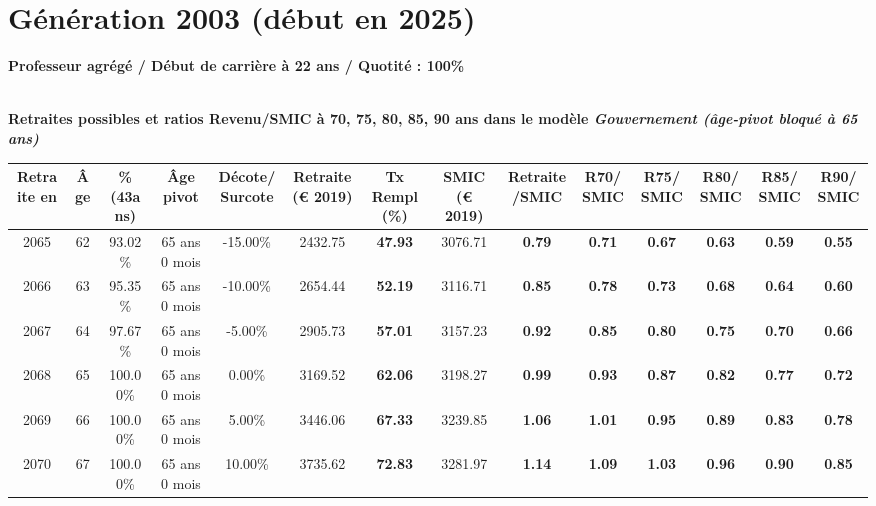 \newpage 
 
\section{Génération 2003 (début en 2025)\label{ProfAgrege_100_2003_22_0}} 
 
{\bf \noindent Professeur agrégé / Début de carrière à 22 ans / Quotité : 100\%}  ~ 

 ~\\{\bf \noindent Retraites possibles et ratios Revenu/SMIC à 70, 75, 80, 85, 90 ans dans le modèle \emph{Gouvernement (âge-pivot bloqué à 65 ans)}}  
 
\begin{adjustbox}{max width=\textwidth} 
\begin{tabular}[htb]{|c|c||c|c|c||c|c||c|c||c|c|c|c|c|} 
\hline 
 Retraite en &  Âge &  \%(43ans) &  Âge pivot &  Décote/Surcote &  Retraite (\euro{} 2019) &  Tx Rempl(\%) &  SMIC (\euro{} 2019) &  Retraite/SMIC &  R70/SMIC &  R75/SMIC &  R80/SMIC &  R85/SMIC &  R90/SMIC \\ 
\hline \hline 
 2065 &  62 &  93.02\% &  65 ans 0 mois &  -15.00\% &  2432.75 &  {\bf 47.93} &  3076.71 &  {\bf {\color{red} 0.79}} &  {\bf {\color{red} 0.71}} &  {\bf {\color{red} 0.67}} &  {\bf {\color{red} 0.63}} &  {\bf {\color{red} 0.59}} &  {\bf {\color{red} 0.55}} \\ 
\hline 
 2066 &  63 &  95.35\% &  65 ans 0 mois &  -10.00\% &  2654.44 &  {\bf 52.19} &  3116.71 &  {\bf {\color{red} 0.85}} &  {\bf {\color{red} 0.78}} &  {\bf {\color{red} 0.73}} &  {\bf {\color{red} 0.68}} &  {\bf {\color{red} 0.64}} &  {\bf {\color{red} 0.60}} \\ 
\hline 
 2067 &  64 &  97.67\% &  65 ans 0 mois &  -5.00\% &  2905.73 &  {\bf 57.01} &  3157.23 &  {\bf {\color{red} 0.92}} &  {\bf {\color{red} 0.85}} &  {\bf {\color{red} 0.80}} &  {\bf {\color{red} 0.75}} &  {\bf {\color{red} 0.70}} &  {\bf {\color{red} 0.66}} \\ 
\hline 
 2068 &  65 &  100.00\% &  65 ans 0 mois &  0.00\% &  3169.52 &  {\bf 62.06} &  3198.27 &  {\bf {\color{red} 0.99}} &  {\bf {\color{red} 0.93}} &  {\bf {\color{red} 0.87}} &  {\bf {\color{red} 0.82}} &  {\bf {\color{red} 0.77}} &  {\bf {\color{red} 0.72}} \\ 
\hline 
 2069 &  66 &  100.00\% &  65 ans 0 mois &  5.00\% &  3446.06 &  {\bf 67.33} &  3239.85 &  {\bf 1.06} &  {\bf 1.01} &  {\bf {\color{red} 0.95}} &  {\bf {\color{red} 0.89}} &  {\bf {\color{red} 0.83}} &  {\bf {\color{red} 0.78}} \\ 
\hline 
 2070 &  67 &  100.00\% &  65 ans 0 mois &  10.00\% &  3735.62 &  {\bf 72.83} &  3281.97 &  {\bf 1.14} &  {\bf 1.09} &  {\bf 1.03} &  {\bf {\color{red} 0.96}} &  {\bf {\color{red} 0.90}} &  {\bf {\color{red} 0.85}} \\ 
\hline 
\hline 
\end{tabular} 
\end{adjustbox} 
 
